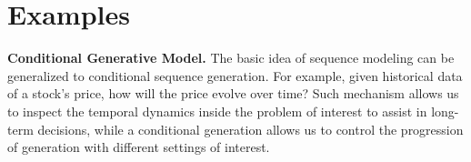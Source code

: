 \section{Examples}
\label{sec:prob}


{\bf Conditional Generative Model.} The basic idea of sequence modeling can be generalized to conditional sequence generation.
For example, given historical data of a stock's price, how will the price evolve over time?
Such mechanism allows us to inspect the temporal dynamics inside the problem of interest to assist in long-term decisions, while a conditional generation allows us to control the progression of generation with different settings of interest.

